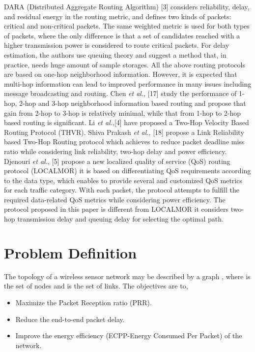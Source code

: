 \documentclass[fleqn,twoside]{article}
\begin{document}
\vskip 2mm
DARA (Distributed Aggregate Routing Algorithm) [3] considers reliability, delay, and residual energy 
in the routing metric, and defines two kinds of packets: critical and non-critical packets. The same weighted metric is used for both types of packets, where the only difference is that a set of candidates reached with a higher transmission power is considered to route critical packets. For delay estimation, the authors use queuing theory and suggest a method that, in practice, needs huge amount of sample
storages.
\vskip 2mm
All the above routing protocols are based on one-hop neighborhood information. However, it is expected that multi-hop information can lead to improved performance in many issues including message broadcasting and routing. Chen \emph{et al.}, [17] study the performance of 1-hop, 2-hop and 3-hop neighborhood information based
routing and propose that gain from 2-hop to 3-hop is relatively minimal, while that from 1-hop to 2-hop based routing is significant.
Li \emph{et al.},[4] have proposed a Two-Hop Velocity Based Routing Protocol (THVR). 
Shiva Prakash  \emph{et al.}, [18] propose a Link Reliability based Two-Hop Routing protocol which achieves to 
reduce packet deadline miss ratio while considering link reliability, two-hop delay and power efficiency.
\vskip 2mm
Djenouri \emph{et al.}, [5] propose a new localized quality of service (QoS) routing protocol (LOCALMOR) it is based on differentiating QoS requirements
according to the data type, which enables to provide several and customized QoS metrics for each traffic category. With each packet,
the protocol attempts to fulfill the required data-related QoS metrics while considering power efficiency. The protocol proposed in this paper is different from LOCALMOR it considers two-hop transmission delay and queuing delay for selecting the optimal path.
 \section{Problem Definition}
\label{section:pd}
The topology of a wireless sensor network may be described by a graph , where  is the set of nodes and  is the set of links. The objectives are to,
\begin{itemize}
\item Maximize the Packet Reception ratio (PRR).
\item Reduce the end-to-end packet delay.
\item Improve the energy efficiency (ECPP-Energy Consumed Per Packet) of the network.
\end{itemize}
\end{document}
